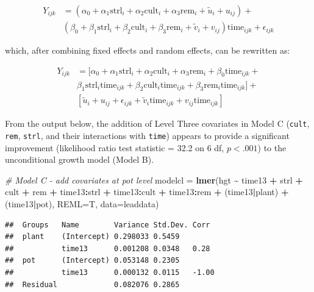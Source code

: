 \documentclass[
]{krantz}
\newenvironment{Shaded}{\begin{snugshade}}{\end{snugshade}}
\newcommand{\AttributeTok}[1]{\textcolor[rgb]{0.27,0.27,0.27}{#1}}
\newcommand{\CommentTok}[1]{\textcolor[rgb]{0.37,0.37,0.37}{\textit{#1}}}
\newcommand{\FunctionTok}[1]{\textcolor[rgb]{0.27,0.27,0.27}{\textbf{#1}}}
\newcommand{\NormalTok}[1]{#1}
\newcommand{\OtherTok}[1]{\textcolor[rgb]{0.37,0.37,0.37}{#1}}
\newcommand{\SpecialCharTok}[1]{\textcolor[rgb]{0.43,0.43,0.43}{\textbf{#1}}}
\begin{document}
\begin{align*}
Y_{ijk} & = (\alpha_{0}+\alpha_{1}\textrm{strl}_{i}+\alpha_{2}\textrm{cult}_{i}+\alpha_{3}\textrm{rem}_{i}+\tilde{u}_{i}+u_{ij}) + \\
 & (\beta_{0}+\beta_{1}\textrm{strl}_{i}+\beta_{2}\textrm{cult}_{i}+\beta_{3}\textrm{rem}_{i}+\tilde{v}_{i}+
 v_{ij})\textrm{time}_{ijk}+\epsilon_{ijk} 
\end{align*}

which, after combining fixed effects and random effects, can be rewritten as:

\begin{align*}
Y_{ijk} & = [\alpha_{0}+\alpha_{1}\textrm{strl}_{i}+\alpha_{2}\textrm{cult}_{i}+\alpha_{3}\textrm{rem}_{i} +
 \beta_{0}\textrm{time}_{ijk} + \\
 & \beta_{1}\textrm{strl}_{i}\textrm{time}_{ijk}+\beta_{2}\textrm{cult}_{i}\textrm{time}_{ijk}+ \beta_{3}\textrm{rem}_{i}\textrm{time}_{ijk}] + \\
 & [\tilde{u}_{i}+u_{ij}+\epsilon_{ijk}+\tilde{v}_{i}\textrm{time}_{ijk}+v_{ij}\textrm{time}_{ijk}]
\end{align*}

From the output below, the addition of Level Three covariates in Model C (\texttt{cult}, \texttt{rem}, \texttt{strl}, and their interactions with \texttt{time}) appears to provide a significant improvement (likelihood ratio test statistic = 32.2 on 6 df, \(p<.001\)) to the unconditional growth model (Model B).

\begin{Shaded}
\begin{Highlighting}[]
\CommentTok{\# Model C {-} add covariates at pot level}
\NormalTok{modelcl }\OtherTok{=} \FunctionTok{lmer}\NormalTok{(hgt }\SpecialCharTok{\textasciitilde{}}\NormalTok{ time13 }\SpecialCharTok{+}\NormalTok{ strl }\SpecialCharTok{+}\NormalTok{ cult }\SpecialCharTok{+}\NormalTok{ rem }\SpecialCharTok{+} 
\NormalTok{    time13}\SpecialCharTok{:}\NormalTok{strl }\SpecialCharTok{+}\NormalTok{ time13}\SpecialCharTok{:}\NormalTok{cult }\SpecialCharTok{+}\NormalTok{ time13}\SpecialCharTok{:}\NormalTok{rem }\SpecialCharTok{+}\NormalTok{ (time13}\SpecialCharTok{|}\NormalTok{plant) }\SpecialCharTok{+}
\NormalTok{    (time13}\SpecialCharTok{|}\NormalTok{pot), }\AttributeTok{REML=}\NormalTok{T, }\AttributeTok{data=}\NormalTok{leaddata)}
\end{Highlighting}
\end{Shaded}

\begin{verbatim}
##  Groups   Name        Variance Std.Dev. Corr 
##  plant    (Intercept) 0.298033 0.5459        
##           time13      0.001208 0.0348   0.28 
##  pot      (Intercept) 0.053148 0.2305        
##           time13      0.000132 0.0115   -1.00
##  Residual             0.082076 0.2865
\end{verbatim}
\end{document}
